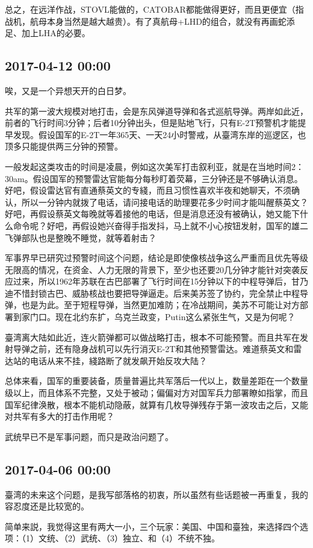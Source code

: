 \documentclass[twocolumn]{ctexart}
\begin{document}
总之，在远洋作战，STOVL能做的，CATOBAR都能做得更好，而且更便宜（指战机，航母本身当然是越大越贵）。有了真航母+LHD的组合，就没有再画蛇添足、加上LHA的必要。\subsection*{2017-04-12 00:00}
唉，又是一个异想天开的白日梦。

共军的第一波大规模对地打击，会是东风弹道导弹和各式巡航导弹。两岸如此近，前者的飞行时间3分钟；后者10分钟出头，但是贴地飞行，只有E-2T预警机才能提早发现。假设国军的E-2T一年365天、一天24小时警戒，从臺湾东岸的巡逻区，也顶多只能提供两三分钟的预警。

一般发起这类攻击的时间是凌晨，例如这次美军打击叙利亚，就是在当地时间2：30am。假设国军的预警雷达官能每分每秒盯着荧幕，三分钟还是不够确认消息。好吧，假设雷达官有直通蔡英文的专綫，而且习惯性喜欢半夜和她聊天，不须确认，所以一分钟内就拨了电话，请问接电话的助理要花多少时间才能叫醒蔡英文？好吧，再假设蔡英文每晚就等着接他的电话，但是消息还没有被确认，她又能下什么命令呢？好吧，再假设她兴奋得手指发抖，马上就不小心按钮发射，国军的雄二飞弹部队也是整晚不睡觉，就等着射击？

军事界早已研究过预警时间这个问题，结论是即使像核战争这么严重而且优先等级无限高的情况，在资金、人力无限的背景下，至少也还要20几分钟才能针对突袭反应过来，所以1962年苏联在古巴部署了飞行时间在15分钟以下的中程导弹后，甘乃迪不惜封锁古巴、威胁核战也要把导弹逼走。后来美苏签了协约，完全禁止中程导弹，也是为此。至于短程导弹，当然更加难防；在冷战期间，美苏不可能让对方部署到家门口。现在北约东扩，乌克兰政变，Putin这么紧张生气，又是为何呢？

臺湾离大陆如此近，连火箭弹都可以做战略打击，根本不可能预警。而且共军在发射导弹之前，还有隐身战机可以先行消灭E-2T和其他预警雷达。难道蔡英文和雷达站的电话从来不挂，綫路断了就发飙开始反攻大陆？

总体来看，国军的重要装备，质量普遍比共军落后一代以上，数量差距在一个数量级以上，而且体系不完整，又处于被动；偏偏对方对国军兵力部署瞭如指掌，而且国军纪律涣散，根本不能机动隐蔽，就算有几枚导弹残存于第一波攻击之后，又能对共军有多大的打击作用呢？

武统早已不是军事问题，而只是政治问题了。\subsection*{2017-04-06 00:00}
臺湾的未来这个问题，是我写部落格的初衷，所以虽然有些话题被一再重复，我的容忍度还是比较宽的。

简单来説，我觉得这里有两大一小，三个玩家：美国、中国和臺独，来选择四个选项：（1）文统、（2）武统、（3）独立、和（4）不统不独。
\end{document}
